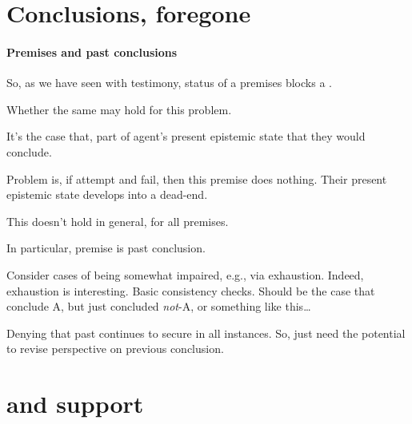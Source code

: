 \section{Conclusions, foregone}
\label{sec:fc3-1}

\paragraph{Premises and past conclusions}

\begin{note}[Premises]
  So, as we have seen with testimony, status of a premises blocks a \requ{}.

  Whether the same may hold for this problem.

  It's the case that, part of agent's present epistemic state that they would conclude.

  Problem is, if attempt and fail, then this premise does nothing.
  Their present epistemic state develops into a dead-end.
\end{note}

\begin{note}[Note!]
  This doesn't hold in general, for all premises.

  In particular, premise is past conclusion.

  Consider cases of being somewhat impaired, e.g., via exhaustion.
  Indeed, exhaustion is interesting.
  Basic consistency checks.
  Should be the case that conclude A, but just concluded \emph{not}-A, or something like this\dots

  Denying that past continues to secure in all instances.
  So, just need the potential to revise perspective on previous conclusion.
\end{note}

\section{ and support}
\label{cha:fcs:sec:fc3-support}

